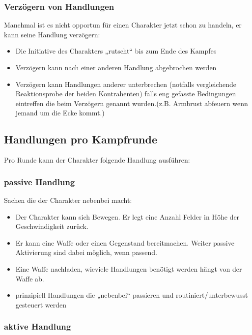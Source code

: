 \documentclass{article}
\begin{document}
\subsubsection{Verzögern von Handlungen}

Manchmal ist es nicht opportun für einen Charakter jetzt schon zu handeln, er kann seine Handlung verzögern:

\begin{itemize}
\item Die Initiative des Charakters „rutscht“ bis zum Ende des Kampfes
\item Verzögern kann nach einer anderen Handlung abgebrochen werden
\item Verzögern kann Handlungen anderer unterbrechen (notfalls vergleichende Reaktionsprobe der beiden Kontrahenten) falls eng gefasste Bedingungen eintreffen die beim Verzögern genannt wurden.(z.B. Armbrust abfeuern wenn jemand um die Ecke kommt.)
\end{itemize}

\begin{center}
\subsection{Handlungen pro Kampfrunde}
\end{center}

Pro Runde kann der Charakter folgende Handlung ausführen:

\subsubsection{passive Handlung}

Sachen die der Charakter nebenbei macht:

\begin{itemize}
\item Der Charakter kann sich Bewegen. Er legt eine Anzahl Felder in Höhe der Geschwindigkeit zurück.
\item Er kann eine Waffe oder einen Gegenstand bereitmachen. Weiter passive Aktivierung sind dabei möglich, wenn passend.
\item Eine Waffe nachladen, wieviele Handlungen benötigt werden hängt von der Waffe ab.
\item prinzipiell Handlungen die „nebenbei“ passieren und routiniert/unterbewusst gesteuert werden
\end{itemize}

\subsubsection{aktive Handlung}
\end{document}
